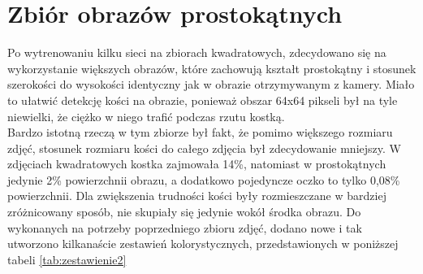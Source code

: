 \section{Zbiór obrazów prostokątnych}
Po wytrenowaniu kilku sieci na zbiorach kwadratowych, zdecydowano się na wykorzystanie
większych obrazów, które zachowują kształt prostokątny i stosunek szerokości do wysokości
identyczny jak w obrazie otrzymywanym z kamery. Miało to ułatwić detekcję kości na obrazie,
ponieważ obszar 64x64 pikseli był na tyle niewielki, że ciężko w niego trafić podczas
rzutu kostką.\\
Bardzo istotną rzeczą w tym zbiorze był fakt, że pomimo większego rozmiaru zdjęć, stosunek
rozmiaru kości do całego zdjęcia był zdecydowanie mniejszy. W zdjęciach kwadratowych kostka
zajmowała 14\%, natomiast w prostokątnych jedynie 2\% powierzchnii obrazu, a dodatkowo pojedyncze
oczko to tylko 0,08\% powierzchnii.
Dla zwiększenia trudności kości były rozmieszczane w bardziej zróżnicowany sposób, nie skupiały
się jedynie wokół środka obrazu. Do wykonanych na potrzeby poprzedniego zbioru zdjęć, dodano
nowe i tak utworzono kilkanaście zestawień kolorystycznych, przedstawionych w poniższej tabeli \ref{tab:zestawienie2} \newpage

